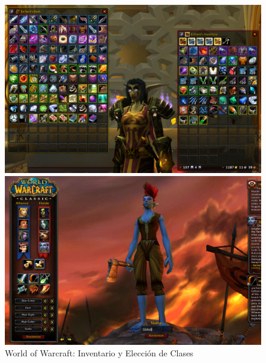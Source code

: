 \begin{figure}[ht]
    \centering
    \begin{minipage}{.45\textwidth}
        \includegraphics[width=\textwidth]{imgs/wow-inventory.png}
    \end{minipage}
    \begin{minipage}{.45\textwidth}
        \includegraphics[width=\textwidth]{imgs/wow-class-choice.jpg}
    \end{minipage}
    \caption{World of Warcraft: Inventario y Elección de Clases}
    \label{multifig:wow}
\end{figure}

